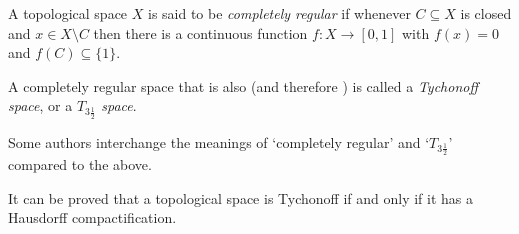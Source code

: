 \documentclass[12pt]{article}
\begin{document}

A topological space $X$ is said to be \emph{completely regular} if whenever $C\subseteq X$ is closed and $x\in X\setminus C$ then there is a continuous function $f\colon X\to[0,1]$ with $f(x)=0$ and $f(C)\subseteq\{1\}$.

A completely regular space that is also  (and therefore )
is called a \emph{Tychonoff space}, or a \emph{$T_{3\frac{1}{2}}$ space}.

Some authors interchange the meanings of `completely regular' and `$T_{3\frac{1}{2}}$' compared to the above.

It can be proved that a topological space is Tychonoff
if and only if it has a Hausdorff compactification.

\end{document}
